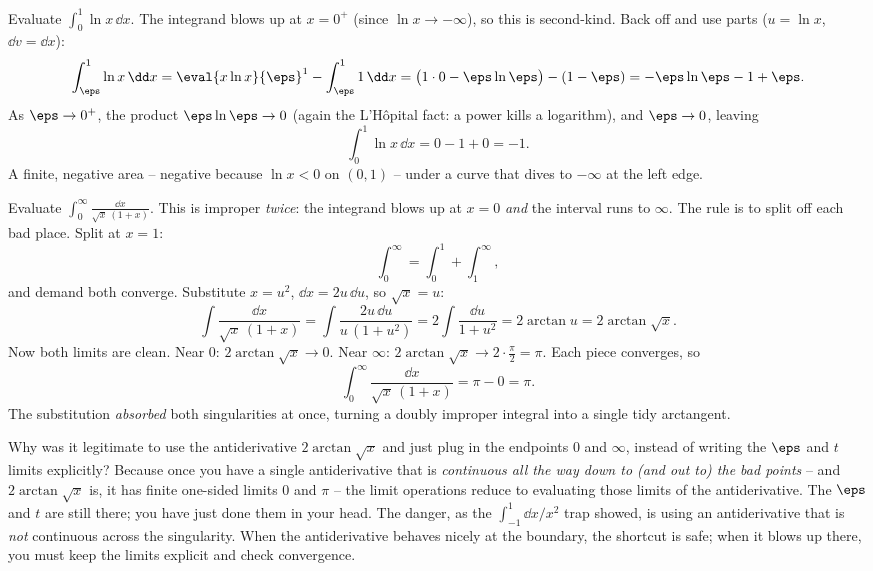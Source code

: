 \begin{example}
\label{ch25:ex-logspike}
Evaluate $\displaystyle\int_0^{1} \ln x \, \dd x$. The integrand blows up at
$x=0^+$ (since $\ln x \to -\infty$), so this is second-kind. Back off and use parts
($u=\ln x$, $\dd v = \dd x$):
\[
  \int_{\eps}^{1}\ln x\,\dd x
  = \eval{x\ln x}{\eps}^{1} - \int_{\eps}^{1} 1\,\dd x
  = \bigl(1\cdot 0 - \eps\ln\eps\bigr) - (1 - \eps)
  = -\eps\ln\eps - 1 + \eps.
\]
As $\eps\to 0^+$, the product $\eps\ln\eps\to 0$ (again the L'H\^opital fact:
a power kills a logarithm), and $\eps\to 0$, leaving
\[
  \int_0^{1}\ln x\,\dd x = 0 - 1 + 0 = -1.
\]
A finite, negative area -- negative because $\ln x < 0$ on $(0,1)$ -- under a curve
that dives to $-\infty$ at the left edge.
\end{example}

\begin{example}
\label{ch25:ex-double-improper}
Evaluate $\displaystyle\int_0^{\infty}\frac{\dd x}{\sqrt{x}\,(1+x)}$. This is
improper \emph{twice}: the integrand blows up at $x=0$ \emph{and} the interval runs
to $\infty$. The rule is to split off each bad place. Split at $x=1$:
\[
  \int_0^{\infty} = \int_0^{1} + \int_1^{\infty},
\]
and demand both converge. Substitute $x = u^2$, $\dd x = 2u\,\dd u$, so
$\sqrt x = u$:
\[
  \int \frac{\dd x}{\sqrt x\,(1+x)}
  = \int \frac{2u\,\dd u}{u\,(1+u^2)}
  = 2\int \frac{\dd u}{1+u^2}
  = 2\arctan u = 2\arctan\sqrt x.
\]
Now both limits are clean. Near $0$: $2\arctan\sqrt x \to 0$. Near $\infty$:
$2\arctan\sqrt x \to 2\cdot \tfrac{\pi}{2} = \pi$. Each piece converges, so
\[
  \int_0^{\infty}\frac{\dd x}{\sqrt x\,(1+x)} = \pi - 0 = \pi.
\]
The substitution \emph{absorbed} both singularities at once, turning a doubly
improper integral into a single tidy arctangent.
\end{example}

\begin{whybox}
Why was it legitimate to use the antiderivative $2\arctan\sqrt x$ and just plug in
the endpoints $0$ and $\infty$, instead of writing the $\eps$ and $t$ limits
explicitly? Because once you have a single antiderivative that is \emph{continuous
all the way down to (and out to) the bad points} -- and $2\arctan\sqrt x$ is, it has
finite one-sided limits $0$ and $\pi$ -- the limit operations reduce to evaluating
those limits of the antiderivative. The $\eps$ and $t$ are still there; you have
just done them in your head. The danger, as the $\int_{-1}^1 \dd x/x^2$ trap showed,
is using an antiderivative that is \emph{not} continuous across the singularity.
When the antiderivative behaves nicely at the boundary, the shortcut is safe; when
it blows up there, you must keep the limits explicit and check convergence.
\end{whybox}

